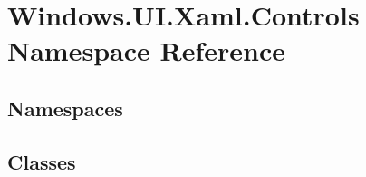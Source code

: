\hypertarget{namespace_windows_1_1_u_i_1_1_xaml_1_1_controls}{}\section{Windows.\+U\+I.\+Xaml.\+Controls Namespace Reference}
\label{namespace_windows_1_1_u_i_1_1_xaml_1_1_controls}
\subsection*{Namespaces}
\begin{DoxyCompactItemize}
\end{DoxyCompactItemize}
\subsection*{Classes}

